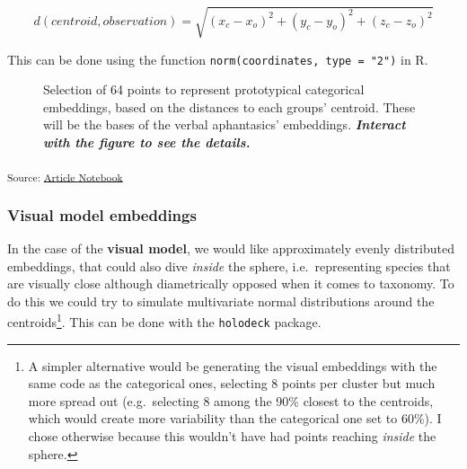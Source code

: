 \documentclass[
  authoryear]{elsarticle}
\begin{document}
\[d(centroid, observation) = \sqrt{(x_{c} - x_{o})^{2} + (y_{c} - y_{o})^{2} + (z_{c} - z_{o})^{2}}\]

This can be done using the function
\texttt{norm(coordinates,\ type\ =\ "2")} in R.

\label{cell-fig-categorical-embeddings}
\begin{figure}[H]


\caption{\label{fig-categorical-embeddings}Selection of 64 points to
represent prototypical categorical embeddings, based on the distances to
each groups' centroid. These will be the bases of the verbal
aphantasics' embeddings. \textbf{\emph{Interact with the figure to see
the details.}}}

\end{figure}%

\textsubscript{Source:
\href{https://m-delem.github.io/2499-similarity-manuscript/index.qmd.html}{Article
Notebook}}

\subsubsection{Visual model embeddings}\label{visual-model-embeddings}

In the case of the \textbf{visual model}, we would like approximately
evenly distributed embeddings, that could also dive \emph{inside} the
sphere, i.e.~representing species that are visually close although
diametrically opposed when it comes to taxonomy. To do this we could try
to simulate multivariate normal distributions around the
centroids\footnote{A simpler alternative would be generating the visual
  embeddings with the same code as the categorical ones, selecting 8
  points per cluster but much more spread out (e.g.~selecting 8 among
  the 90\% closest to the centroids, which would create more variability
  than the categorical one set to 60\%). I chose otherwise because this
  wouldn't have had points reaching \emph{inside} the sphere.}. This can
be done with the \texttt{holodeck} package.
\end{document}
